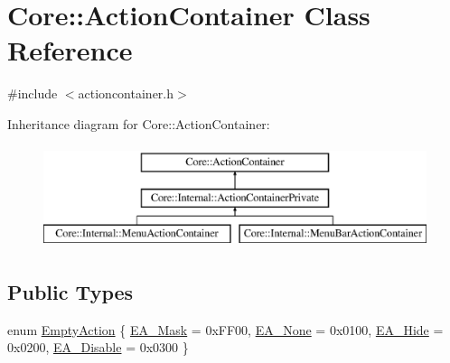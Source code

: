 \hypertarget{class_core_1_1_action_container}{\section{\-Core\-:\-:\-Action\-Container \-Class \-Reference}
\label{class_core_1_1_action_container}
}


{\ttfamily \#include $<$actioncontainer.\-h$>$}

\-Inheritance diagram for \-Core\-:\-:\-Action\-Container\-:\begin{figure}[H]
\begin{center}
\leavevmode
\includegraphics[height=3.000000cm]{class_core_1_1_action_container}
\end{center}
\end{figure}
\subsection*{\-Public \-Types}
\begin{DoxyCompactItemize}
\item 
enum \hyperlink{group___core_plugin_ga25957afb898f645827d8e7949c831327}{\-Empty\-Action} \{ \hyperlink{group___core_plugin_gga25957afb898f645827d8e7949c831327af1a70360b274cf469d7fd0a42007e614}{\-E\-A\-\_\-\-Mask} =  0x\-F\-F00, 
\hyperlink{group___core_plugin_gga25957afb898f645827d8e7949c831327a2492c1e5772bc04b21150f29a3620354}{\-E\-A\-\_\-\-None} =  0x0100, 
\hyperlink{group___core_plugin_gga25957afb898f645827d8e7949c831327aed8a4c98f66c29197b772529c4959190}{\-E\-A\-\_\-\-Hide} =  0x0200, 
\hyperlink{group___core_plugin_gga25957afb898f645827d8e7949c831327aefaf5abf9c05ed2a6a6b75b2c1824186}{\-E\-A\-\_\-\-Disable} =  0x0300
 \}
\end{DoxyCompactItemize}
